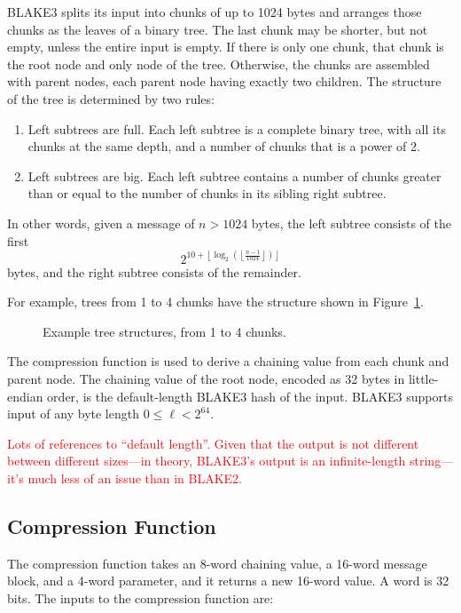 \documentclass[11pt,notitlepage,a4paper]{article}
\newcommand{\alert}[1]{\textcolor{red}{#1}}
\begin{document}
BLAKE3 splits its input into chunks of up to 1024 bytes and arranges those
chunks as the leaves of a binary tree. The last chunk may be shorter, but not
empty, unless the entire input is empty. If there is only one chunk, that chunk
is the root node and only node of the tree. Otherwise, the chunks are assembled
with parent nodes, each parent node having exactly two children. The
structure of the tree is determined by two rules:
\begin{enumerate}
    \item Left subtrees are full. Each left subtree is a complete binary tree,
        with all its chunks at the same depth, and a number of chunks that is a
        power of 2.
    \item Left subtrees are big. Each left subtree contains a number of chunks
        greater than or equal to the number of chunks in its sibling right
        subtree.
\end{enumerate}
In other words, given a message of $n > 1024$ bytes, the left subtree consists of the first $$2^{10 + \left\lfloor \log_2 \left(\left\lfloor \frac{n-1}{1024} \right\rfloor\right) \right\rfloor}$$ bytes, and the right subtree consists of the remainder.

For example, trees from 1 to 4 chunks have the structure shown in
Figure~\ref{fig:fourchunks}.

\begin{figure}[h]
\centering
 
\caption{Example tree structures, from 1 to 4 chunks.}
\label{fig:fourchunks}
\end{figure}

The compression function is used to derive a chaining value from each chunk and
parent node. The chaining value of the root node, encoded as 32 bytes in
little-endian order, is the default-length BLAKE3 hash of the input. BLAKE3
supports input of any byte length $0 \leq \ell < 2^{64}$.

\alert{Lots of references to ``default length''. Given that the output is not different between different sizes---in theory, BLAKE3's output is an infinite-length string---it's much less of an issue than in BLAKE2.}

\subsection{Compression Function}\label{sec:compression}

The compression function takes an 8-word chaining value, a 16-word message
block, and a 4-word parameter, and it returns a new 16-word value. A word is 32 bits. The inputs to
the compression function are:
\end{document}
